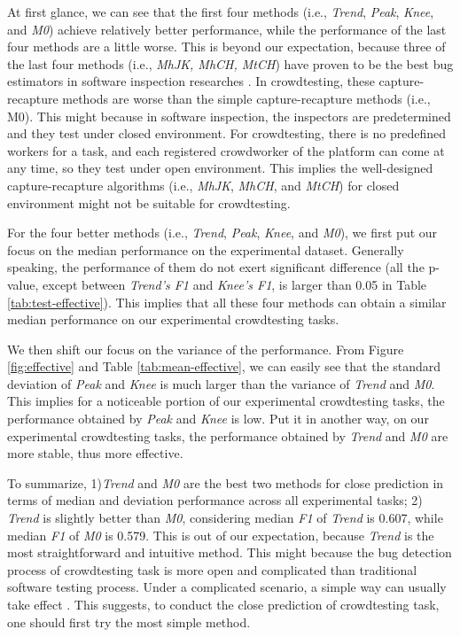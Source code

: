 \documentclass[sigconf,review, anonymous]{acmart}
\begin{document}
At first glance, we can see that the first four methods (i.e., \textit{Trend}, \textit{Peak}, \textit{Knee}, and \textit{M0}) achieve relatively better performance, while the performance of the last four methods are a little worse.
This is beyond our expectation, because three of the last four methods (i.e., \textit{MhJK, MhCH, MtCH}) have proven to be the best bug estimators in software inspection researches \cite{liu2015adoption,briand2000comprehensive,chun2006estimating,rong2017towards}.
In crowdtesting, these capture-recapture methods are worse than the simple capture-recapture methods (i.e., M0).
This might because in software inspection, the inspectors are predetermined and they test under closed environment.
For crowdtesting, there is no predefined workers for a task, and each registered crowdworker of the platform can come at any time, so they test under open environment.
This implies the well-designed capture-recapture algorithms (i.e., \textit{MhJK}, \textit{MhCH}, and \textit{MtCH}) for closed environment might not be suitable for crowdtesting.

For the four better methods (i.e., \textit{Trend}, \textit{Peak}, \textit{Knee}, and \textit{M0}), we first put our focus on the median performance on the experimental dataset.
Generally speaking, the performance of them do not exert significant difference (all the p-value, except between \textit{Trend's F1} and \textit{Knee's F1}, is larger than 0.05 in Table \ref{tab:test-effective}).
This implies that all these four methods can obtain a similar median performance on our experimental crowdtesting tasks.


We then shift our focus on the variance of the performance.
From Figure \ref{fig:effective} and Table \ref{tab:mean-effective}, we can easily see that the standard deviation of \textit{Peak} and \textit{Knee} is much larger than the variance of \textit{Trend} and \textit{M0}.
This implies for a noticeable portion of our experimental crowdtesting tasks, the performance obtained by \textit{Peak} and \textit{Knee} is low.
Put it in another way, on our experimental crowdtesting tasks, the performance obtained by \textit{Trend} and \textit{M0} are more stable, thus more effective. 

To summarize, 1)\textit{Trend} and \textit{M0} are the best two methods for close prediction in terms of median and deviation performance across all experimental tasks; 2) \textit{Trend} is slightly better than \textit{M0}, considering median \textit{F1} of \textit{Trend} is 0.607, while median \textit{F1} of \textit{M0} is 0.579.
This is out of our expectation, because \textit{Trend} is the most straightforward and intuitive method.
This might because the bug detection process of crowdtesting task is more open and complicated than traditional software testing process.
Under a complicated scenario, a simple way can usually take effect \cite{brighton2006robust,fu2017easy}.
This suggests, to conduct the close prediction of crowdtesting task, one should first try the most simple method.
\end{document}
